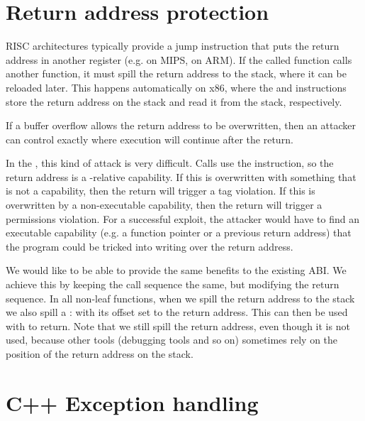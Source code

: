 \section{Return address protection}

RISC architectures typically provide a jump instruction that puts the return address in another register (e.g.  on MIPS,  on ARM).
If the called function calls another function, it must spill the return address to the stack, where it can be reloaded later.
This happens automatically on x86, where the  and  instructions store the return address on the stack and read it from the stack, respectively.

If a buffer overflow allows the return address to be overwritten, then an attacker can control exactly where execution will continue after the return.

In the \purecapABI{}, this kind of attack is very difficult.
Calls use the  instruction, so the return address is a -relative capability.
If this is overwritten with something that is not a capability, then the return will trigger a tag violation.
If this is overwritten by a non-executable capability, then the return will trigger a permissions violation.
For a successful exploit, the attacker would have to find an executable capability (e.g. a function pointer or a previous return address) that the program could be tricked into writing over the return address.

We would like to be able to provide the same benefits to the existing ABI.
We achieve this by keeping the call sequence the same, but modifying the return sequence.
In all non-leaf functions, when we spill the return address to the stack we also spill a :  with its offset set to the return address.
This can then be used with  to return.
Note that we still spill the return address, even though it is not used, because other tools (debugging tools and so on) sometimes rely on the position of the return address on the stack.


\section{C++ Exception handling}

